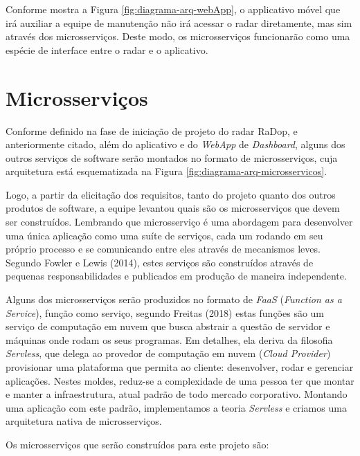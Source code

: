 Conforme mostra a Figura \ref{fig:diagrama-arq-webApp}, o applicativo móvel que irá auxiliar a equipe de manutenção não irá acessar o radar diretamente, mas sim através dos microsserviços. Deste modo, os microsserviços funcionarão como uma espécie de interface entre o radar e o aplicativo.

\section{Microsserviços}

Conforme definido na fase de iniciação de projeto do radar RaDop, e anteriormente citado, além do aplicativo e do \textit{WebApp} de \textit{Dashboard}, alguns dos outros serviços de software serão montados no formato de microsserviços, cuja arquitetura está esquematizada na Figura \ref{fig:diagrama-arq-microsservicos}.

Logo, a partir da elicitação dos requisitos, tanto do projeto quanto dos outros produtos de software, a equipe levantou quais são os microsserviços que devem ser construídos. Lembrando que microsserviço é uma abordagem para desenvolver uma única aplicação como uma suíte de serviços, cada um rodando em seu próprio processo e se comunicando entre eles através de mecanismos leves. Segundo Fowler e Lewis (2014), estes serviços são construídos através de pequenas responsabilidades e publicados em produção de maneira independente.

Alguns dos microsserviços serão produzidos no formato de \textit{FaaS} (\textit{Function as a Service}), função como serviço, segundo Freitas (2018) estas funções são um serviço de computação em nuvem que busca abstrair a questão de servidor e máquinas onde rodam os seus programas. Em detalhes, ela deriva da filosofia \textit{Servless}, que delega ao provedor de computação em nuvem (\textit{Cloud Provider}) provisionar uma plataforma que permita ao cliente: desenvolver, rodar e gerenciar aplicações. Nestes moldes, reduz-se a complexidade de uma pessoa ter que montar e manter a infraestrutura, atual padrão de todo mercado corporativo. Montando uma aplicação com este padrão, implementamos a teoria \textit{Servless} e criamos uma arquitetura nativa de microsserviços.


Os microsserviços que serão construídos para este projeto são:

